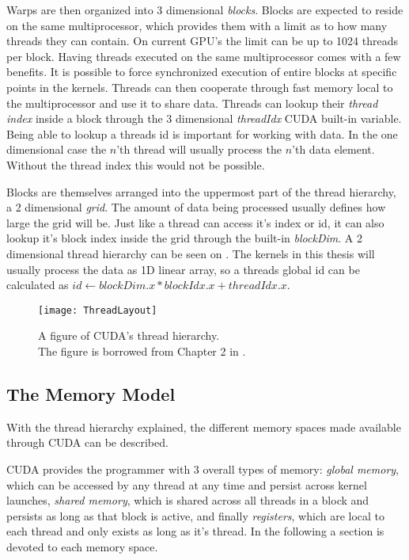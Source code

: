 

Warps are then organized into 3 dimensional \textit{blocks}. Blocks
are expected to reside on the same multiprocessor, which provides them
with a limit as to how many threads they can contain. On current GPU's
the limit can be up to 1024 threads per block. Having threads executed
on the same multiprocessor comes with a few benefits. It is possible
to force synchronized execution of entire blocks at specific points in
the kernels. Threads can then cooperate through fast memory local to
the multiprocessor and use it to share data. Threads can lookup their
\textit{thread index} inside a block through the 3 dimensional
\textit{threadIdx} CUDA built-in variable. Being able to lookup a
threads id is important for working with data. In the one dimensional
case the $n$'th thread will usually process the $n$'th data
element. Without the thread index this would not be possible.


Blocks are themselves arranged into the uppermost part of the thread
hierarchy, a 2 dimensional \textit{grid}. The amount of data being
processed usually defines how large the grid will be. Just like a
thread can access it's index or id, it can also lookup it's block
index inside the grid through the built-in \textit{blockDim}. A 2
dimensional thread hierarchy can be seen on
. The kernels in this thesis will usually
process the data as 1D linear array, so a threads global id can be
calculated as $id \leftarrow blockDim.x * blockIdx.x + threadIdx.x$.

\begin{figure}
  \centering
  \texttt{[image: ThreadLayout]}
  \caption[CUDA's thread hierarchy.]{A figure of CUDA's thread
    hierarchy.\\ The figure is borrowed from Chapter 2 in
    .}
  \label{fig:threadLayout}
\end{figure}




\subsection{The Memory Model}

With the thread hierarchy explained, the different memory spaces made
available through CUDA can be described.  

CUDA provides the programmer with 3 overall types of memory:
\textit{global memory}, which can be accessed by any thread at any
time and persist across kernel launches, \textit{shared memory}, which
is shared across all threads in a block and persists as long as that
block is active, and finally \textit{registers}, which are local to
each thread and only exists as long as it's thread. In the following a
section is devoted to each memory space.

